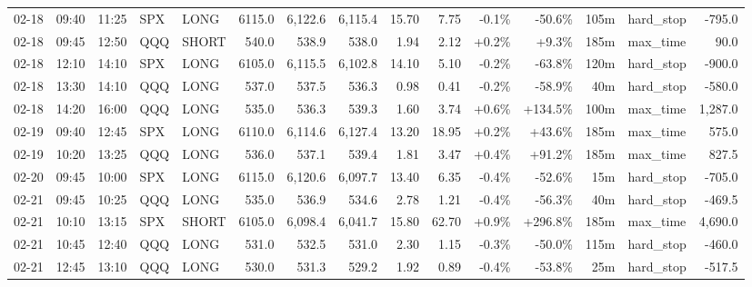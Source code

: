 \documentclass[11pt,a4paper,twoside]{article}
\begin{document}
\begin{landscape}
\begin{center}
\begin{longtable}{>{\color{txtmain}}l l l l l r r r r r r r r >{\color{txtmain}}l r}
02-18 & 09:40 & 11:25 & SPX & LONG & 6115.0 & 6,122.6 & 6,115.4 & 15.70 & 7.75 & \textcolor{lossred}{-0.1\%} & \textcolor{lossred}{-50.6\%} & 105m & hard\_stop & \textcolor{lossred}{-795.0} \\
02-18 & 09:45 & 12:50 & QQQ & SHORT & 540.0 & 538.9 & 538.0 & 1.94 & 2.12 & \textcolor{wingreen}{+0.2\%} & \textcolor{wingreen}{+9.3\%} & 185m & max\_time & \textcolor{wingreen}{90.0} \\
02-18 & 12:10 & 14:10 & SPX & LONG & 6105.0 & 6,115.5 & 6,102.8 & 14.10 & 5.10 & \textcolor{lossred}{-0.2\%} & \textcolor{lossred}{-63.8\%} & 120m & hard\_stop & \textcolor{lossred}{-900.0} \\
02-18 & 13:30 & 14:10 & QQQ & LONG & 537.0 & 537.5 & 536.3 & 0.98 & 0.41 & \textcolor{lossred}{-0.2\%} & \textcolor{lossred}{-58.9\%} & 40m & hard\_stop & \textcolor{lossred}{-580.0} \\
02-18 & 14:20 & 16:00 & QQQ & LONG & 535.0 & 536.3 & 539.3 & 1.60 & 3.74 & \textcolor{wingreen}{+0.6\%} & \textcolor{wingreen}{+134.5\%} & 100m & max\_time & \textcolor{wingreen}{1,287.0} \\
02-19 & 09:40 & 12:45 & SPX & LONG & 6110.0 & 6,114.6 & 6,127.4 & 13.20 & 18.95 & \textcolor{wingreen}{+0.2\%} & \textcolor{wingreen}{+43.6\%} & 185m & max\_time & \textcolor{wingreen}{575.0} \\
02-19 & 10:20 & 13:25 & QQQ & LONG & 536.0 & 537.1 & 539.4 & 1.81 & 3.47 & \textcolor{wingreen}{+0.4\%} & \textcolor{wingreen}{+91.2\%} & 185m & max\_time & \textcolor{wingreen}{827.5} \\
02-20 & 09:45 & 10:00 & SPX & LONG & 6115.0 & 6,120.6 & 6,097.7 & 13.40 & 6.35 & \textcolor{lossred}{-0.4\%} & \textcolor{lossred}{-52.6\%} & 15m & hard\_stop & \textcolor{lossred}{-705.0} \\
02-21 & 09:45 & 10:25 & QQQ & LONG & 535.0 & 536.9 & 534.6 & 2.78 & 1.21 & \textcolor{lossred}{-0.4\%} & \textcolor{lossred}{-56.3\%} & 40m & hard\_stop & \textcolor{lossred}{-469.5} \\
02-21 & 10:10 & 13:15 & SPX & SHORT & 6105.0 & 6,098.4 & 6,041.7 & 15.80 & 62.70 & \textcolor{wingreen}{+0.9\%} & \textcolor{wingreen}{+296.8\%} & 185m & max\_time & \textcolor{wingreen}{4,690.0} \\
02-21 & 10:45 & 12:40 & QQQ & LONG & 531.0 & 532.5 & 531.0 & 2.30 & 1.15 & \textcolor{lossred}{-0.3\%} & \textcolor{lossred}{-50.0\%} & 115m & hard\_stop & \textcolor{lossred}{-460.0} \\
02-21 & 12:45 & 13:10 & QQQ & LONG & 530.0 & 531.3 & 529.2 & 1.92 & 0.89 & \textcolor{lossred}{-0.4\%} & \textcolor{lossred}{-53.8\%} & 25m & hard\_stop & \textcolor{lossred}{-517.5} \\

\end{longtable}
\end{center}
\end{landscape}
\end{document}
